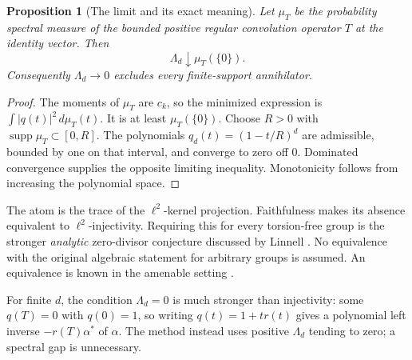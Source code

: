 \documentclass[11pt,a4paper,oneside]{report}
\newtheorem{proposition}[theorem]{Proposition}
\theoremstyle{definition}
\theoremstyle{remark}
\DeclareMathOperator{\supp}{supp}
\begin{document}
\begin{proposition}[The limit and its exact meaning]\label{M03:prop:limit}
Let \(\mu_T\) be the probability spectral measure of the bounded positive regular convolution operator \(T\) at the identity vector. Then
\begin{equation}\label{M03:eq:atomlimit}
\Lambda_d\downarrow\mu_T(\{0\}).
\end{equation}
Consequently \(\Lambda_d\to0\) excludes every finite-support annihilator.
\end{proposition}
\begin{proof}
The moments of \(\mu_T\) are \(c_k\), so the minimized expression is \(\int|q(t)|^2\,d\mu_T(t)\). It is at least \(\mu_T(\{0\})\). Choose \(R>0\) with \(\supp\mu_T\subset[0,R]\). The polynomials \(q_d(t)=(1-t/R)^d\) are admissible, bounded by one on that interval, and converge to zero off \(0\). Dominated convergence supplies the opposite limiting inequality. Monotonicity follows from increasing the polynomial space.
\end{proof}
The atom is the trace of the \(\ell^2\)-kernel projection. Faithfulness makes its absence equivalent to \(\ell^2\)-injectivity. Requiring this for every torsion-free group is the stronger \emph{analytic} zero-divisor conjecture discussed by Linnell \cite{B:Linnell}. No equivalence with the original algebraic statement for arbitrary groups is assumed. An equivalence is known in the amenable setting \cite{B:Elek}.

For finite \(d\), the condition \(\Lambda_d=0\) is much stronger than injectivity: some \(q(T)=0\) with \(q(0)=1\), so writing \(q(t)=1+tr(t)\) gives a polynomial left inverse \(-r(T)\alpha^*\) of \(\alpha\). The method instead uses positive \(\Lambda_d\) tending to zero; a spectral gap is unnecessary.
\end{document}
